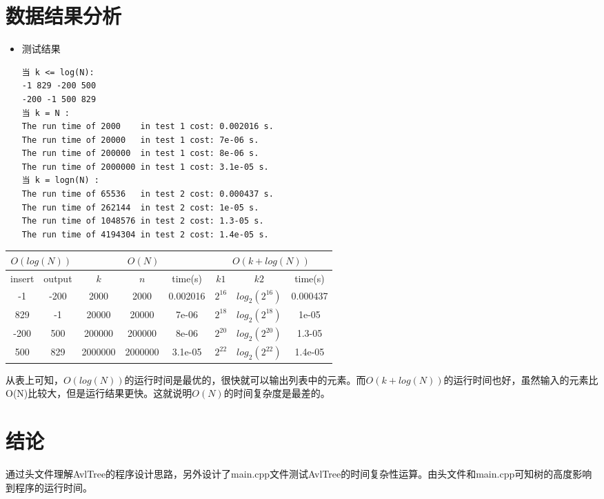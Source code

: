 \documentclass[a4paper]{article}
\begin{document}
\section{数据结果分析}
\begin{itemize}
\item 测试结果
\begin{verbatim}
当 k <= log(N):
-1 829 -200 500
-200 -1 500 829
当 k = N : 
The run time of 2000    in test 1 cost: 0.002016 s.
The run time of 20000   in test 1 cost: 7e-06 s.
The run time of 200000  in test 1 cost: 8e-06 s.
The run time of 2000000 in test 1 cost: 3.1e-05 s. 
当 k = logn(N) :
The run time of 65536   in test 2 cost: 0.000437 s.
The run time of 262144  in test 2 cost: 1e-05 s.
The run time of 1048576 in test 2 cost: 1.3-05 s.
The run time of 4194304 in test 2 cost: 1.4e-05 s.
\end{verbatim}
\end{itemize}
\begin{center}
\begin{tabular}{|c|c|c|c|c|c|c|c|}
    \hline
    \multicolumn{2}{|c}{$O(log(N))$} & \multicolumn{3}{|c|}{$O(N)$}  &  \multicolumn{3}{|c|}{$O(k + log(N))$} \\
    \hline
    insert & output & $k$ & $n$ & time(s) & $k1$ & $k2$ & time(s) \\
    \hline
    -1 & -200 & 2000 & 2000 & 0.002016 & $2^{16}$ & $log_2(2^{16})$ & 0.000437 \\
    \hline
    829 & -1 & 20000 & 20000 & 7e-06 & $2^{18}$ & $log_2(2^{18})$ & 1e-05 \\
    \hline
    -200 & 500 & 200000 & 200000 & 8e-06 & $2^{20}$ & $log_2(2^{20})$ & 1.3-05 \\
    \hline
    500 & 829 & 2000000 & 2000000 & 3.1e-05 & $2^{22}$ & $log_2(2^{22})$ & 1.4e-05 \\
    \hline
\end{tabular}
\end{center}
从表上可知，$O(log(N))$的运行时间是最优的，很快就可以输出列表中的元素。而$O(k + log(N))$的运行时间也好，虽然输入的元素比O(N)比较大，但是运行结果更快。这就说明$O(N)$的时间复杂度是最差的。

\section{结论}
通过头文件理解AvlTree的程序设计思路，另外设计了main.cpp文件测试AvlTree的时间复杂性运算。由头文件和main.cpp可知树的高度影响到程序的运行时间。
\end{document}
